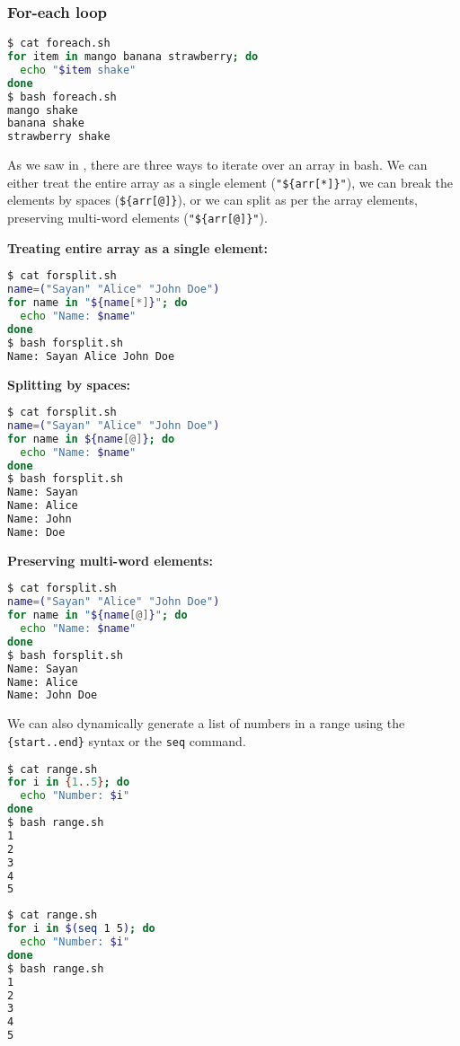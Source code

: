 \subsubsection{For-each loop}

\begin{lstlisting}[language=bash]
$ cat foreach.sh
for item in mango banana strawberry; do
  echo "$item shake"
done
$ bash foreach.sh
mango shake
banana shake
strawberry shake
\end{lstlisting}

As we saw in , there are three ways to iterate over an array in bash.
We can either treat the entire array as a single element (\lstinline|"${arr[*]}"|),
we can break the elements by spaces (\lstinline|${arr[@]}|),
or we can split as per the array elements, preserving multi-word elements (\lstinline|"${arr[@]}"|).

\textbf{Treating entire array as a single element:}
\begin{lstlisting}[language=bash]
$ cat forsplit.sh
name=("Sayan" "Alice" "John Doe")
for name in "${name[*]}"; do
  echo "Name: $name"
done
$ bash forsplit.sh
Name: Sayan Alice John Doe
\end{lstlisting}

\textbf{Splitting by spaces:}

\begin{lstlisting}[language=bash]
$ cat forsplit.sh
name=("Sayan" "Alice" "John Doe")
for name in ${name[@]}; do
  echo "Name: $name"
done
$ bash forsplit.sh
Name: Sayan
Name: Alice
Name: John
Name: Doe
\end{lstlisting}

\textbf{Preserving multi-word elements:}

\begin{lstlisting}[language=bash]
$ cat forsplit.sh
name=("Sayan" "Alice" "John Doe")
for name in "${name[@]}"; do
  echo "Name: $name"
done
$ bash forsplit.sh
Name: Sayan
Name: Alice
Name: John Doe
\end{lstlisting}

We can also dynamically generate a list of numbers in a range using the \lstinline|{start..end}| syntax or the \lstinline|seq| command.

\begin{lstlisting}[language=bash]
$ cat range.sh
for i in {1..5}; do
  echo "Number: $i"
done
$ bash range.sh
1
2
3
4
5
\end{lstlisting}

\begin{lstlisting}[language=bash]
$ cat range.sh
for i in $(seq 1 5); do
  echo "Number: $i"
done
$ bash range.sh
1
2
3
4
5
\end{lstlisting}

